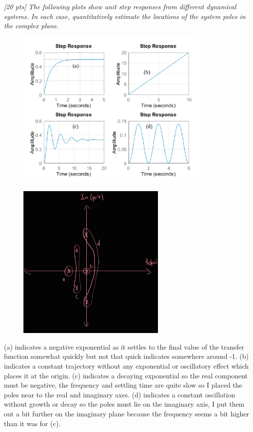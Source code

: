\documentclass{article}
\begin{document}
\textit{[20 pts] The following plots show unit step responses from different dynamical systems. In each case, quantitatively estimate the locations of the system poles in the complex plane.}

\begin{figure}[H]
    \centering
    \includegraphics[width=0.85\textwidth]{q4fig.png}
\end{figure}

\begin{figure}[H]
    \centering
    \includegraphics[width=0.65\textwidth]{q4plot.jpg}
\end{figure}

(a) indicates a negative exponential as it settles to the final value of the transfer function somewhat quickly but not that quick indicates somewhere around -1.
(b) indicates a constant trajectory without any exponential or oscillatory effect which places it at the origin.
(c) indicates a decaying exponential so the real component must be negative, the frequency and settling time are quite slow so I placed the poles near to the real and imaginary axes.
(d) indicates a constant oscillation without growth or decay so the poles must lie on the imaginary axis, I put them out a bit further on the imaginary plane because the frequency seems a bit higher than it was for (c).
\end{document}
